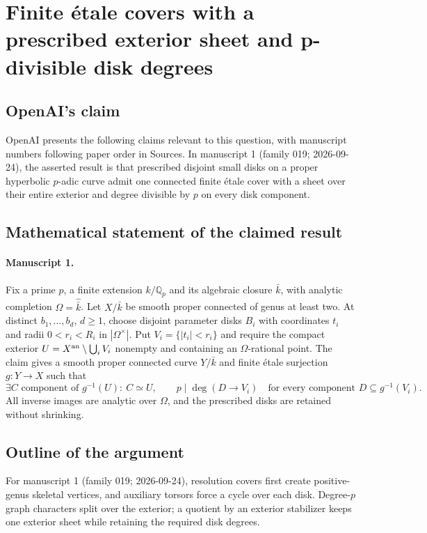 \documentclass[11pt]{article}
\begin{document}
\section*{Finite étale covers with a prescribed exterior sheet and p-divisible disk degrees}

\subsection{OpenAI's claim}
OpenAI presents the following claims relevant to this question, with manuscript numbers following paper order in Sources. In manuscript 1 (family 019; 2026-09-24), the asserted result is that prescribed disjoint small disks on a proper hyperbolic $p$-adic curve admit one connected finite \'{e}tale cover with a sheet over their entire exterior and degree divisible by $p$ on every disk component.

\subsection{Mathematical statement of the claimed result}
\paragraph{Manuscript 1.}
Fix a prime $p$, a finite extension $k/\mathbb Q_p$ and its algebraic closure $\bar k$, with analytic completion $\Omega=\widehat{\bar k}$. Let $X/\bar k$ be smooth proper connected of genus at least two. At distinct $b_1,\ldots,b_d$, $d\ge1$, choose disjoint parameter disks $B_i$ with coordinates $t_i$ and radii $0<r_i<R_i$ in $|\Omega^{\times}|$. Put $V_i=\{|t_i|<r_i\}$ and require the compact exterior $U=X^{\rm an}\setminus\bigcup_iV_i$ nonempty and containing an $\Omega$-rational point. The claim gives a smooth proper connected curve $Y/\bar k$ and finite \'etale surjection $g:Y\to X$ such that
\[
 \exists C\text{ component of }g^{-1}(U):\ C\simeq U,
 \qquad
 p\mid\deg(D\to V_i)\quad\text{for every component }D\subseteq g^{-1}(V_i).
\]
All inverse images are analytic over $\Omega$, and the prescribed disks are retained without shrinking.

\subsection{Outline of the argument}
For manuscript 1 (family 019; 2026-09-24), resolution covers first create positive-genus skeletal vertices, and auxiliary torsors force a cycle over each disk. Degree-$p$ graph characters split over the exterior; a quotient by an exterior stabilizer keeps one exterior sheet while retaining the required disk degrees.
\end{document}
